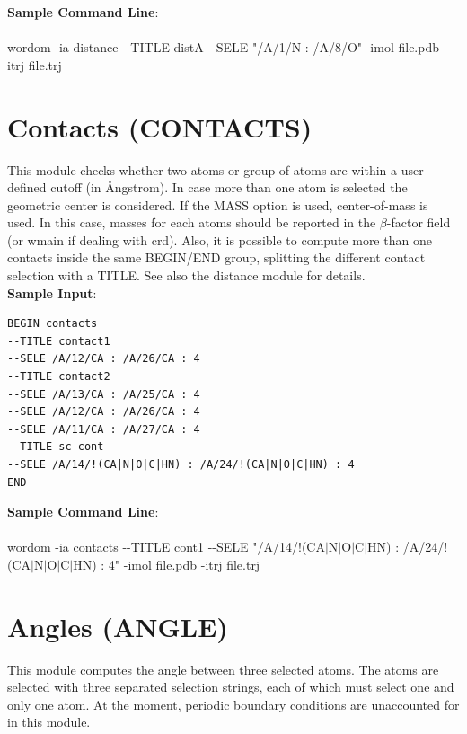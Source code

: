 \documentclass[11pt,twoside,onecolumn,a4paper,openright,notitlepage]{book}[2001/04/21]
\begin{document}
\textbf{\large Sample Command Line}:\\\\
\textsf{\large wordom -ia distance -{}-TITLE distA -{}-SELE "/A/1/N : /A/8/O" -imol file.pdb -itrj file.trj}

\clearpage{}

\section{Contacts (CONTACTS)}
This module checks whether two atoms or group of atoms are within a user-defined cutoff (in \AA{}ngstrom). In case more than one atom is selected the geometric center is considered. If the MASS option is used, center-of-mass is used. In this case, masses for each atoms should be reported in the $\beta{}$-factor field (or wmain if dealing with crd). Also, it is possible to compute more than one contacts inside the same BEGIN/END group, splitting the different contact selection with a TITLE. See also the distance module for details.\\

\textbf{\large Sample Input}:
\begin{verbatim}
BEGIN contacts
--TITLE contact1
--SELE /A/12/CA : /A/26/CA : 4
--TITLE contact2
--SELE /A/13/CA : /A/25/CA : 4
--SELE /A/12/CA : /A/26/CA : 4
--SELE /A/11/CA : /A/27/CA : 4
--TITLE sc-cont
--SELE /A/14/!(CA|N|O|C|HN) : /A/24/!(CA|N|O|C|HN) : 4
END
\end{verbatim}

\textbf{\large Sample Command Line}:\\\\
\textsf{\large wordom -ia contacts -{}-TITLE cont1 -{}-SELE "/A/14/!(CA$\mid$N$\mid{}$O$\mid{}$C$\mid{}$HN) : /A/24/!(CA$\mid{}$N$\mid{}$O$\mid{}$C$\mid{}$HN) : 4" -imol file.pdb -itrj file.trj}

\clearpage{}

\section{Angles (ANGLE)}
This module computes the angle between three selected atoms. The atoms are selected with three separated selection strings, each of which must select one and only one atom. At the moment, periodic boundary conditions are unaccounted for in this module.\\
\end{document}
